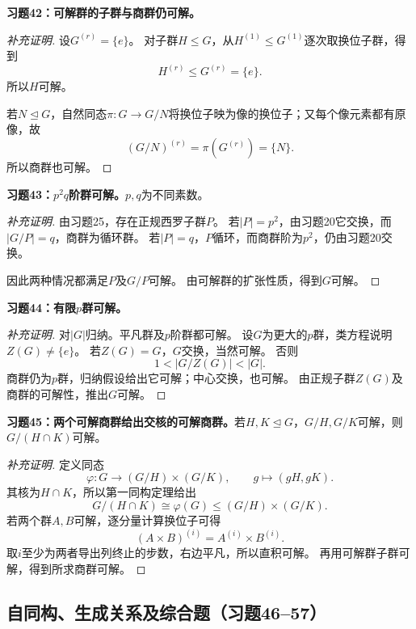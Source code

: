 \begin{problem}
\textbf{习题42：可解群的子群与商群仍可解。}
\end{problem}
\begin{proof}[补充证明]
设$G^{(r)}=\{e\}$。
对子群$H\leq G$，从$H^{(1)}\leq G^{(1)}$逐次取换位子群，得到
\[
H^{(r)}\leq G^{(r)}=\{e\}.
\]
所以$H$可解。

若$N\trianglelefteq G$，自然同态$\pi:G\to G/N$将换位子映为像的换位子；又每个像元素都有原像，故
\[
(G/N)^{(r)}=\pi(G^{(r)})=\{N\}.
\]
所以商群也可解。
\end{proof}

\begin{problem}
\textbf{习题43：$p^2q$阶群可解。}$p,q$为不同素数。
\end{problem}
\begin{proof}[补充证明]
由习题25，存在正规西罗子群$P$。
若$|P|=p^2$，由习题20它交换，而$|G/P|=q$，商群为循环群。
若$|P|=q$，$P$循环，而商群阶为$p^2$，仍由习题20交换。

因此两种情况都满足$P$及$G/P$可解。
由可解群的扩张性质，得到$G$可解。
\end{proof}

\begin{problem}
\textbf{习题44：有限$p$群可解。}
\end{problem}
\begin{proof}[补充证明]
对$|G|$归纳。平凡群及$p$阶群都可解。
设$G$为更大的$p$群，类方程说明$Z(G)\neq\{e\}$。
若$Z(G)=G$，$G$交换，当然可解。
否则
\[
1<|G/Z(G)|<|G|.
\]
商群仍为$p$群，归纳假设给出它可解；中心交换，也可解。
由正规子群$Z(G)$及商群的可解性，推出$G$可解。
\end{proof}

\begin{problem}
\textbf{习题45：两个可解商群给出交核的可解商群。}若$H,K\trianglelefteq G$，$G/H,G/K$可解，则$G/(H\cap K)$可解。
\end{problem}
\begin{proof}[补充证明]
定义同态
\[
\varphi:G\to(G/H)\times(G/K),\qquad g\longmapsto(gH,gK).
\]
其核为$H\cap K$，所以第一同构定理给出
\[
G/(H\cap K)\cong\varphi(G)\leq(G/H)\times(G/K).
\]
若两个群$A,B$可解，逐分量计算换位子可得
\[
(A\times B)^{(i)}=A^{(i)}\times B^{(i)}.
\]
取$i$至少为两者导出列终止的步数，右边平凡，所以直积可解。
再用可解群子群可解，得到所求商群可解。
\end{proof}

\subsection*{自同构、生成关系及综合题（习题46--57）}

